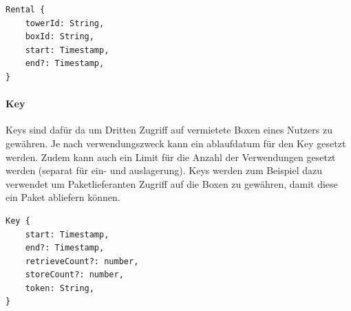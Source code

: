 \begin{verbatim}
Rental {
    towerId: String,
    boxId: String,
    start: Timestamp,
    end?: Timestamp,
}
\end{verbatim}


\paragraph{Key}
Keys sind dafür da um Dritten Zugriff auf vermietete Boxen eines Nutzers zu gewähren. Je nach verwendungszweck kann ein ablaufdatum für den Key gesetzt werden. Zudem kann auch ein Limit für die Anzahl der Verwendungen gesetzt werden (separat für ein- und auslagerung). Keys werden zum Beispiel dazu verwendet um Paketlieferanten Zugriff auf die Boxen zu gewähren, damit diese ein Paket abliefern können.

\begin{verbatim}
Key {
    start: Timestamp,
    end?: Timestamp,
    retrieveCount?: number,
    storeCount?: number,
    token: String,
}
\end{verbatim}